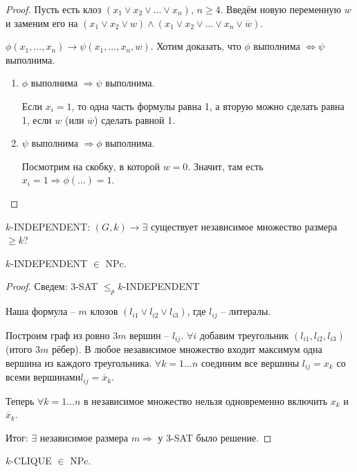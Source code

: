 \begin{proof}
    Пусть есть клоз $(x_1\vee x_2 \vee ... \vee x_n)$, $n\geq 4$.
    Введём новую переменную $w$ и заменим его на $(x_1\vee x_2 \vee w)\wedge (x_1\vee x_2 \vee ... \vee x_n \vee \overline{w})$.

    $\phi(x_1,...,x_n)\rightarrow \psi(x_1,...,x_n, w)$. Хотим доказать, что $\phi$ выполнима $\Leftrightarrow\psi$ выполнима.

    \begin{enumerate}
        \item $\phi$ выполнима $\Rightarrow\psi$ выполнима.

        Если $x_i=1$, то одна часть формулы равна 1, а вторую можно сделать равна 1, если $w$ (или $\overline{w}$) сделать равной 1.

        \item $\psi$ выполнима $\Rightarrow\phi$ выполнима.

        Посмотрим на скобку, в которой $w=0$. Значит, там есть $x_i=1\Rightarrow \phi(...)=1$.
    \end{enumerate}
\end{proof}

\begin{definition}
    $k$-INDEPENDENT: $(G,k)\rightarrow\exists$ существует независимое множество размера $\geq k$?
\end{definition}

\begin{theorem}
    $k$-INDEPENDENT $\in$ NPc.
\end{theorem}

\begin{proof}
    Сведем: $3$-SAT $\leq_p k$-INDEPENDENT

    Наша формула – $m$ клозов $(l_{i1}\vee l_{i2}\vee l_{i3})$, где $l_{ij}$ – литералы.

    Построим граф из ровно $3m$ вершин – $l_{ij}$. $\forall i$ добавим треугольник $(l_{i1},l_{i2},l_{i3})$ (итого $3m$ рёбер). В любое независимое множество входит максимум одна вершина из каждого треугольника. $\forall k=1...n$ соединим все вершины $l_{ij}=x_k$ со всеми вершинами$l_{ij}=\overline{x}_k$.

    Теперь $\forall k=1...n$ в независимое множество нельзя одновременно включить $x_k$ и $\overline{x}_k$.

    Итог: $\exists$ независимое размера $m\Rightarrow$  у 3-SAT было решение.
\end{proof}

\begin{theorem}
    $k$-CLIQUE $\in$ NPc.
\end{theorem}

